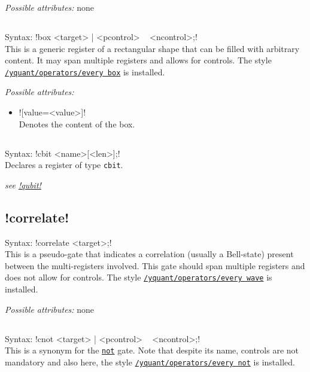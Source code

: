 \documentclass{scrartcl}
\def\gate#1{\hyperref[gate:#1]{\texttt{#1}}}
\def\style#1{\hyperref[style:#1]{\texttt{#1}}}
\begin{document}
         \emph{Possible attributes:} none

      \subsection{\texorpdfstring{}{box}}\label{gate:box}
         Syntax: \yquant!box <target> | <pcontrol> ~ <ncontrol>;! \\
         This is a generic register of a rectangular shape that can be filled with arbitrary content.
         It may span multiple registers and allows for controls.
         The style \style{/yquant/operators/every box} is installed.

         \emph{Possible attributes:}
         \begin{itemize}
            \item \yquant![value=<value>]! \\
               Denotes the content of the box.
         \end{itemize}

      \subsection{\texorpdfstring{}{cbit}}\label{gate:cbit}
         Syntax: \yquant!cbit <name>[<len>];! \\
         Declares a register of type \texttt{cbit}.

         \emph{see \hyperref[gate:qubit]{\yquant!qubit!}}

      \subsection[\texorpdfstring{\yquant{correlate}}{correlate}]{\yquant!correlate!}\label{gate:correlate}
         Syntax: \yquant!correlate <target>;! \\
         This is a pseudo\hyp gate that indicates a correlation (usually a Bell\hyp state) present between the multi\hyp registers involved.
         This gate should span multiple registers and does not allow for controls.
         The style \style{/yquant/operators/every wave} is installed.

         \emph{Possible attributes:} none

      \subsection{\texorpdfstring{}{cnot}}\label{gate:cnot}
         Syntax: \yquant!cnot <target> | <pcontrol> ~ <ncontrol>;! \\
         This is a synonym for the \gate{not} gate.
         Note that despite its name, controls are not mandatory and also here, the style \style{/yquant/operators/every not} is installed.
\end{document}
